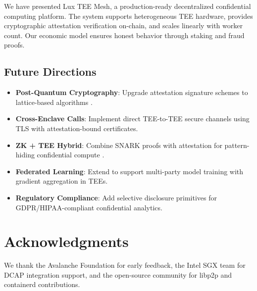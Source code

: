 \documentclass[11pt,letterpaper]{article}
\begin{document}
We have presented Lux TEE Mesh, a production-ready decentralized confidential computing platform. The system supports heterogeneous TEE hardware, provides cryptographic attestation verification on-chain, and scales linearly with worker count. Our economic model ensures honest behavior through staking and fraud proofs.

\subsection{Future Directions}

\begin{itemize}
  \item \textbf{Post-Quantum Cryptography}: Upgrade attestation signature schemes to lattice-based algorithms \cite{nist-pqc}.

  \item \textbf{Cross-Enclave Calls}: Implement direct TEE-to-TEE secure channels using TLS with attestation-bound certificates.

  \item \textbf{ZK + TEE Hybrid}: Combine SNARK proofs with attestation for pattern-hiding confidential compute \cite{zk-tee-hybrid}.

  \item \textbf{Federated Learning}: Extend to support multi-party model training with gradient aggregation in TEEs.

  \item \textbf{Regulatory Compliance}: Add selective disclosure primitives for GDPR/HIPAA-compliant confidential analytics.
\end{itemize}

\section*{Acknowledgments}

We thank the Avalanche Foundation for early feedback, the Intel SGX team for DCAP integration support, and the open-source community for libp2p and containerd contributions.
\end{document}
